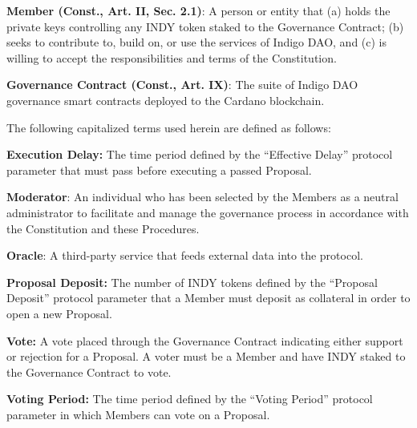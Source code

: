 \textbf{Member (Const., Art. II, Sec. 2.1)}: A person or entity that (a)
holds the private keys controlling any INDY token staked to the
Governance Contract; (b) seeks to contribute to, build on, or use the
services of Indigo DAO, and (c) is willing to accept the
responsibilities and terms of the Constitution.

\textbf{Governance Contract (Const., Art. IX)}: The suite of Indigo DAO
governance smart contracts deployed to the Cardano blockchain.

The following capitalized terms used herein are defined as follows:

\textbf{Execution Delay:} The time period defined by the ``Effective
Delay'' protocol parameter that must pass before executing a passed
Proposal.

\textbf{Moderator}: An individual who has been selected by the Members
as a neutral administrator to facilitate and manage the governance
process in accordance with the Constitution and these Procedures.

\textbf{Oracle}: A third-party service that feeds external data into the
protocol.

\textbf{Proposal Deposit:} The number of INDY tokens defined by the
``Proposal Deposit'' protocol parameter that a Member must deposit as
collateral in order to open a new Proposal.

\textbf{Vote:} A vote placed through the Governance Contract indicating
either support or rejection for a Proposal. A voter must be a Member and
have INDY staked to the Governance Contract to vote.

\textbf{Voting Period:} The time period defined by the ``Voting Period''
protocol parameter in which Members can vote on a Proposal.
